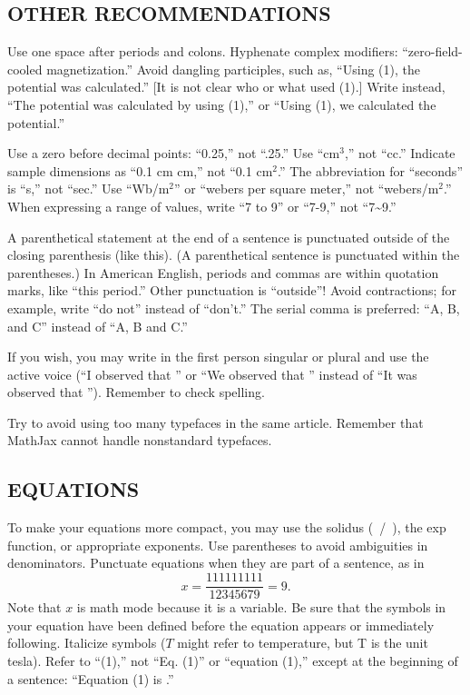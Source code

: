 \documentclass{ieeetj}
\begin{document}
\subsection{OTHER RECOMMENDATIONS}
Use one space after periods and colons. Hyphenate complex modifiers:
``zero-field-cooled magnetization.'' Avoid dangling participles, such as,
``Using (1), the potential was calculated.'' [It is not clear who or what
used (1).] Write instead, ``The potential was calculated by using (1),'' or
``Using (1), we calculated the potential.''

Use a zero before decimal points: ``0.25,'' not ``.25.'' Use ``cm$^3$,'' not
``cc.'' Indicate sample dimensions as ``0.1 cm  cm,'' not
``0.1  cm$^{2}$.'' The abbreviation for ``seconds'' is ``s,''
not ``sec.'' Use ``Wb/m$^{2}$'' or ``webers per square meter,'' not
``webers/m$^2$.'' When expressing a range of values, write ``7 to 9'' or
``7-9,'' not ``7\textasciitilde 9.''

A parenthetical statement at the end of a sentence is punctuated outside of
the closing parenthesis (like this). (A parenthetical sentence is punctuated
within the parentheses.) In American English, periods and commas are within
quotation marks, like ``this period.'' Other punctuation is ``outside''!
Avoid contractions; for example, write ``do not'' instead of ``don't.'' The
serial comma is preferred: ``A, B, and C'' instead of ``A, B and C.''

If you wish, you may write in the first person singular or plural and use
the active voice (``I observed that \textellipsis'' or ``We observed that \textellipsis''
instead of ``It was observed that \textellipsis''). Remember to check spelling.

Try to avoid using too many typefaces in the same article.
Remember that MathJax cannot handle nonstandard typefaces.

\subsection{EQUATIONS}
To make your equations more
compact, you may use the solidus (~/~), the exp function, or appropriate
exponents. Use parentheses to avoid ambiguities in denominators. Punctuate
equations when they are part of a sentence, as in
\begin{equation}
\label{eq1}
x=\frac{111111111}{12345679}=9 .
\end{equation}
Note that $x$ is math mode because it is a variable.
Be sure that the symbols in your equation have been defined before the
equation appears or immediately following. Italicize symbols ($T$ might refer
to temperature, but T is the unit tesla). Refer to ``(1),'' not ``Eq. (1)''
or ``equation (1),'' except at the beginning of a sentence: ``Equation (1)
is \textellipsis .''
\end{document}
